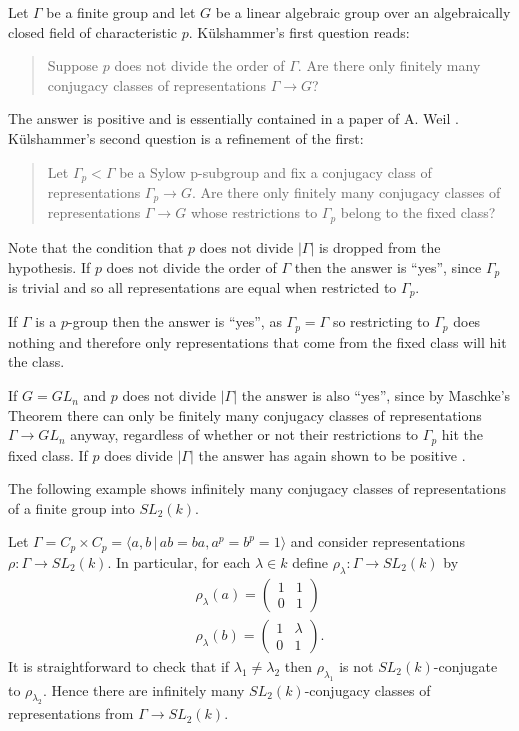 Let $\Gamma$ be a finite group and let $G$ be a linear algebraic group over an algebraically closed field of characteristic $p$. K\"ulshammer's first question reads:
\begin{quote}
  Suppose $p$ does not divide the order of $\Gamma$. Are there only finitely many conjugacy classes of representations $\Gamma\rightarrow G$?
\end{quote}
The answer is positive and is essentially contained in a paper of A. Weil \cite{weil1964remarks}. K\"ulshammer's second question is a refinement of the first:
\begin{quote}
  Let $\Gamma_p < \Gamma$ be a Sylow p-subgroup and fix a conjugacy class of representations $\Gamma_p\rightarrow G$. Are there only finitely many conjugacy classes of representations $\Gamma\rightarrow G$ whose restrictions to $\Gamma_p$ belong to the fixed class?
\end{quote}
Note that the condition that $p$ does not divide $|\Gamma|$ is dropped from the hypothesis. If $p$ does not divide the order of $\Gamma$ then the answer is ``yes'', since $\Gamma_p$ is trivial and so all representations are equal when restricted to $\Gamma_p$.

If $\Gamma$ is a $p$-group then the answer is ``yes'', as $\Gamma_p = \Gamma$ so restricting to $\Gamma_p$ does nothing and therefore only representations that come from the fixed class will hit the class.

If $G=GL_n$ and $p$ does not divide $|\Gamma|$ the answer is also ``yes'', since by Maschke's Theorem there can only be finitely many conjugacy classes of representations $\Gamma\rightarrow GL_n$ anyway, regardless of whether or not their restrictions to $\Gamma_p$ hit the fixed class. If $p$ does divide $|\Gamma|$ the answer has again shown to be positive \cite[Theorem]{slodowy1997two}.

The following example shows infinitely many conjugacy classes of representations of a finite group into $SL_2(k)$.
\begin{example}
  Let $\Gamma = C_p \times C_p = \langle a, b \,|\, ab = ba, a^p = b^p = 1 \rangle$ and consider representations $\rho: \Gamma \rightarrow SL_2(k)$. In particular, for each $\lambda \in k$ define $\rho_\lambda: \Gamma \rightarrow SL_2(k)$ by
  \begin{align*}
    \rho_\lambda(a) = \left( \begin{matrix} 1 & 1 \\ 0 & 1 \end{matrix} \right) \\
    \rho_\lambda(b) = \left( \begin{matrix} 1 & \lambda \\ 0 & 1 \end{matrix} \right).
  \end{align*}
  It is straightforward to check that if $\lambda_1 \neq \lambda_2$ then $\rho_{\lambda_1}$ is not $SL_2(k)$-conjugate to $\rho_{\lambda_2}$. Hence there are infinitely many $SL_2(k)$-conjugacy classes of representations from $\Gamma \rightarrow SL_2(k)$.
\end{example}

